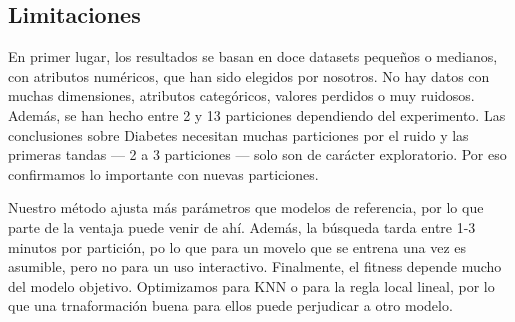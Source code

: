 \subsection{Limitaciones}
En primer lugar, los resultados se basan en doce datasets pequeños o medianos, con atributos numéricos, que han sido elegidos por nosotros. No hay datos con muchas dimensiones, atributos categóricos, valores perdidos o muy ruidosos. Además, se han hecho entre 2 y 13 particiones dependiendo del experimento. Las conclusiones sobre Diabetes necesitan muchas particiones por el ruido y las primeras tandas --- 2 a 3 particiones --- solo son de carácter exploratorio. Por eso confirmamos lo importante con nuevas particiones. 

Nuestro método ajusta más parámetros que modelos de referencia, por lo que parte de la ventaja puede venir de ahí. Además, la búsqueda tarda entre 1-3 minutos por partición, po lo que para un movelo que se entrena una vez es asumible, pero no para un uso interactivo. Finalmente, el fitness depende mucho del modelo objetivo. Optimizamos para KNN o para la regla local lineal, por lo que una trnaformación buena para ellos puede perjudicar a otro modelo. 
